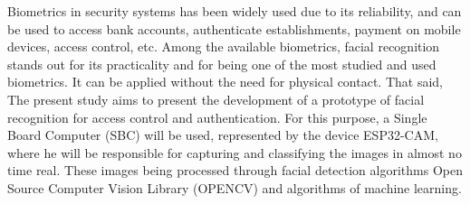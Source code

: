 
\begin{abstractutfpr}%
Biometrics in security systems has been widely used due to its
reliability, and can be used to access bank accounts, authenticate
establishments, payment on mobile devices, access control, etc.
Among the available biometrics, facial recognition stands out for its
practicality and for being one of the most studied and used biometrics.
It can be applied without the need for physical contact. That said,
The present study aims to present the development of a prototype of
facial recognition for access control and authentication. For this purpose,
a Single Board Computer (SBC) will be used, represented by the device
ESP32-CAM, where he will be responsible for capturing and classifying the images in almost no time
real. These images being processed through facial detection algorithms
Open Source Computer Vision Library (OPENCV) and algorithms
of machine learning.
\end{abstractutfpr}
